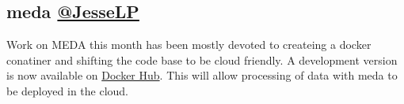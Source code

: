 \documentclass[simplex.tex]{subfiles}
\begin{document}
\subsection[meda]{meda \href{https://github.com/mrae}{@JesseLP}}


Work on MEDA this month has been mostly devoted to createing a docker
conatiner and shifting the code base to be cloud friendly.  A
development version is  now available on
\href{https://hub.docker.com/r/neurodata/meda/}{Docker Hub}.  This will
allow processing of data with meda to be deployed in the cloud.  







\clearpage
\end{document}
